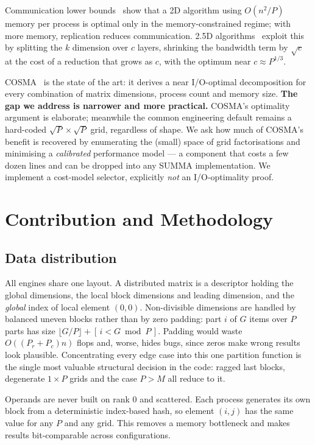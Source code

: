 \documentclass[conference,10pt]{IEEEtran}
\begin{document}
Communication lower bounds~\cite{irony2004,ballard2011} show that a 2D
algorithm using $O(n^2/P)$ memory per process is optimal only in the
memory-constrained regime; with more memory, replication reduces communication.
2.5D algorithms~\cite{solomonik2011} exploit this by splitting the $k$
dimension over $c$ layers, shrinking the bandwidth term by $\sqrt{c}$ at the
cost of a reduction that grows as $c$, with the optimum near $c\approx P^{1/3}$.

COSMA~\cite{cosma2019} is the state of the art: it derives a near
I/O-optimal decomposition for every combination of matrix dimensions, process
count and memory size. \textbf{The gap we address is narrower and more
practical.} COSMA's optimality argument is elaborate; meanwhile the common
engineering default remains a hard-coded $\sqrt{P}\times\sqrt{P}$ grid,
regardless of shape. We ask how much of COSMA's benefit is recovered by
enumerating the (small) space of grid factorisations and minimising a
\emph{calibrated} performance model --- a component that costs a few dozen
lines and can be dropped into any SUMMA implementation. We implement a
cost-model selector, explicitly \emph{not} an I/O-optimality proof.

\section{Contribution and Methodology}

\subsection{Data distribution}

All engines share one layout. A distributed matrix is a descriptor holding the
global dimensions, the local block dimensions and leading dimension, and the
\emph{global} index of local element $(0,0)$. Non-divisible dimensions are
handled by balanced uneven blocks rather than by zero padding: part $i$ of $G$
items over $P$ parts has size $\lfloor G/P\rfloor + [\,i < G \bmod P\,]$.
Padding would waste $O((P_r{+}P_c)n)$ flops and, worse, hides bugs, since
zeros make wrong results look plausible. Concentrating every edge case into
this one partition function is the single most valuable structural decision in
the code: ragged last blocks, degenerate $1\!\times\!P$ grids and the case
$P > M$ all reduce to it.

Operands are never built on rank 0 and scattered. Each process generates its
own block from a deterministic index-based hash, so element $(i,j)$ has the
same value for any $P$ and any grid. This removes a memory bottleneck and makes
results bit-comparable across configurations.
\end{document}
